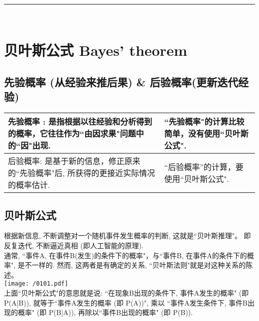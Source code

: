 \documentclass[UTF8]{ctexart}
\begin{document}
~\\
\hrule
~\\



\section{贝叶斯公式 Bayes' theorem}

\subsection{先验概率 (从经验来推后果) \& 后验概率(更新迭代经验)}

\begin{tabular}{|p{}|p{}|}
	\hline
先验概率 :	是指根据以往经验和分析得到的概率，它往往作为``由因求果"问题中的``因"出现.  
&   
``先验概率"的计算比较简单，没有使用``贝叶斯公式". \\
	\hline
后验概率: 是基于新的信息，修正原来的``先验概率"后, 所获得的更接近实际情况的概率估计.	
& ``后验概率''的计算，要使用``贝叶斯公式".
	  \\
	\hline
\end{tabular} 




\subsection{贝叶斯公式}

根据新信息, 不断调整对一个随机事件发生概率的判断, 这就是``贝叶斯推理"。 即反复迭代, 不断逼近真相 (即人工智能的原理). \\

通常, ``事件A, 在事件B(发生)的条件下的概率"，与``事件B, 在事件A的条件下的概率", 是不一样的. 然而, 这两者是有确定的关系, ``贝叶斯法则"就是对这种关系的陈述。 \\

\texttt{[image: /0101.pdf]} \\

上面``贝叶斯公式"的意思就是说: ``在现象B出现的条件下, 事件A发生的概率" (即 P(A|B)), 就等于``事件A发生的概率 (即 P(A))", 乘以 ``事件A发生条件下, 事件B出现的概率" (即 P(B|A)), 再除以``事件B出现的概率" (即 P(B)). \\






















	
	
	
\end{document}

